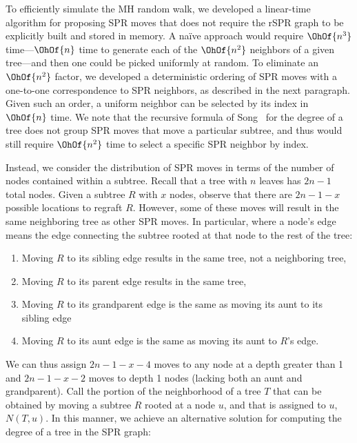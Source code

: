 \documentclass[11pt,onecolumn,conference]{IEEEtran}
\begin{document}
To efficiently simulate the MH random walk, we developed a linear-time algorithm for proposing SPR moves that does not require the rSPR graph to be explicitly built and stored in memory.
A na\"ive approach would require $\OhOf{n^3}$ time---$\OhOf{n}$ time to generate each of the $\OhOf{n^2}$ neighbors of a given tree---and then one could be picked uniformly at random.
To eliminate an $\OhOf{n^2}$ factor, we developed a deterministic ordering of SPR moves with a one-to-one correspondence to SPR neighbors, as described in the next paragraph.
Given such an order, a uniform neighbor can be selected by its index in $\OhOf{n}$ time.
We note that the recursive formula of Song~\cite{Song2003-gf} for the degree of a tree does not group SPR moves that move a particular subtree, and thus would still require $\OhOf{n^2}$ time to select a specific SPR neighbor by index.

Instead, we consider the distribution of SPR moves in terms of the number of nodes contained within a subtree.
Recall that a tree with $n$ leaves has $2n-1$ total nodes.
Given a subtree $R$ with $x$ nodes, observe that there are $2n-1 - x$ possible locations to regraft $R$.
However, some of these moves will result in the same neighboring tree as other SPR moves.
In particular, where a node's edge means the edge connecting the subtree rooted at that node to the rest of the tree:
\begin{enumerate}
\item Moving $R$ to its sibling edge results in the same tree, not a neighboring tree,
\item Moving $R$ to its parent edge results in the same tree,
\item Moving $R$ to its grandparent edge is the same as moving its aunt to its sibling edge
\item Moving $R$ to its aunt edge is the same as moving its aunt to $R$'s edge.
\end{enumerate}
We can thus assign $2n-1-x-4$ moves to any node at a depth greater than 1 and $2n-1-x-2$ moves to depth 1 nodes (lacking both an aunt and grandparent).
Call the portion of the neighborhood of a tree $T$ that can be obtained by moving a subtree $R$ rooted at a node $u$, and that is assigned to $u$, $N(T,u)$.
In this manner, we achieve an alternative solution for computing the degree of a tree in the SPR graph:
\end{document}

